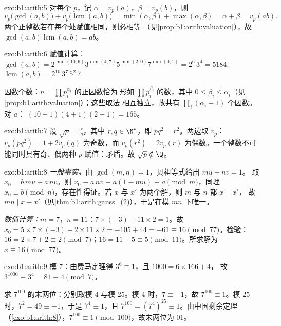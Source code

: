 \begin{solution}{exo:b1:arith:5}
对每个 $p$，记 $\alpha = v_p(a)$，$\beta = v_p(b)$，则
\[
v_p\bigl(\gcd(a,b)\bigr) + v_p\bigl(\operatorname{lcm}(a,b)\bigr)
= \min(\alpha, \beta) + \max(\alpha, \beta)
= \alpha + \beta = v_p(ab) .
\]
两个正整数若在每个处赋值相同，则必相等
（见\cref{prop:b1:arith:valuation}），故 $\gcd(a,b)\operatorname{lcm}(a,b)
= ab$。
\end{solution}

\begin{solution}{exo:b1:arith:6}
赋值计算：$\gcd(a, b) = 2^{\min(10,6)} 3^{\min(4,7)} 5^{\min(2,0)}
7^{\min(0,1)} = 2^6\, 3^4 = 5184$;
$\operatorname{lcm}(a,b) = 2^{10}\, 3^7\, 5^2\, 7$.

因数个数：$n = \prod p_i^{\alpha_i}$ 的正因数恰为
形如 $\prod p_i^{\beta_i}$ 的数，其中 $0 \leq \beta_i \leq
\alpha_i$（见\cref{prop:b1:arith:valuation}）；这些取法
相互独立，故共有 $\prod_i (\alpha_i + 1)$ 个因数。对 $a$：
$(10+1)(4+1)(2+1) = 165$。
\end{solution}

\begin{solution}{exo:b1:arith:7}
设 $\sqrt p = \frac rq$，其中 $r, q \in \N^*$，即 $p q^2 =
r^2$。两边取 $v_p$：$v_p(pq^2) = 1 + 2v_p(q)$ 为奇数，而 $v_p(r^2)
= 2 v_p(r)$ 为偶数。一个整数不可能同时具有奇、偶两种
$p$ 赋值：矛盾。故 $\sqrt p \notin \Q$。
\end{solution}

\begin{solution}{exo:b1:arith:8}
\emph{一般事实。}由 $\gcd(m,n) = 1$，贝祖等式给出 $mu + nv = 1$。
取 $x_0 = b\,mu + a\,nv$。则 $x_0 \equiv a\,nv \equiv a(1 - mu)
\equiv a \pmod m$，同理 $x_0 \equiv b \pmod n$，存在性得证。若
$x$ 与 $x'$ 为两个解，则 $m$ 与 $n$ 都 $x - x'$，
故 $mn \mid x - x'$（见\cref{thm:b1:arith:gauss}~(2)），于是在模
$mn$ 下唯一。

\emph{数值计算：}$m = 7$，$n = 11$：$7 \times (-3) + 11 \times 2 =
1$。故 $x_0 = 5 \times 7 \times (-3) + 2 \times 11 \times 2 = -105 +
44 = -61 \equiv 16 \pmod{77}$。检验：$16 = 2\times 7 + 2 \equiv 2
\pmod 7$；$16 = 11 + 5 \equiv 5 \pmod{11}$。所求解为 $x \equiv 16
\pmod{77}$。
\end{solution}

\begin{solution}{exo:b1:arith:9}
模 $7$：由费马定理得 $3^6 \equiv 1$，且 $1000 = 6 \times 166 + 4$，
故 $3^{1000} \equiv 3^4 = 81 \equiv 4 \pmod 7$。

求 $7^{100}$ 的末两位：分别取模 $4$ 与模 $25$。模 $4$ 时，$7
\equiv -1$，故 $7^{100} \equiv 1$。模 $25$ 时，$7^2 = 49 \equiv -1$，于是
$7^4 \equiv 1$，且 $7^{100} = (7^4)^{25} \equiv 1$。由中国剩余定理
（\cref{exo:b1:arith:8}），$7^{100} \equiv 1
\pmod{100}$，故末两位为 $01$。
\end{solution}

